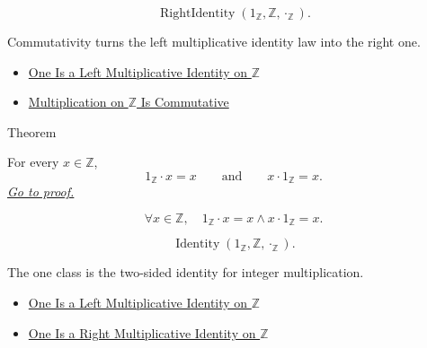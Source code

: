 \begin{remark*}
\[
\operatorname{RightIdentity}(1_{\mathbb{Z}},\mathbb{Z},\cdot_{\mathbb{Z}}).
\]
\end{remark*}

\begin{remark*}[Interpretation]
Commutativity turns the left multiplicative identity law into the right one.
\end{remark*}

\begin{dependencies}
\begin{itemize}
  \item \hyperref[thm:one-left-multiplicative-identity-on-z]{One Is a Left Multiplicative Identity on $\mathbb{Z}$}
  \item \hyperref[thm:multiplication-on-z-commutative]{Multiplication on $\mathbb{Z}$ Is Commutative}
\end{itemize}
\end{dependencies}

\begin{theorembox}{Theorem}
\begin{theorem}
\label{thm:one-multiplicative-identity-on-z}
For every $x\in\mathbb{Z}$,
\[
1_{\mathbb{Z}}\cdot x=x
\qquad\text{and}\qquad
x\cdot 1_{\mathbb{Z}}=x.
\]
\hyperref[prf:one-multiplicative-identity-on-z]{\textit{Go to proof.}}
\end{theorem}
\end{theorembox}

\begin{remark*}
\[
\forall x\in\mathbb{Z},\quad
1_{\mathbb{Z}}\cdot x=x\land x\cdot 1_{\mathbb{Z}}=x.
\]
\end{remark*}

\begin{remark*}
\[
\operatorname{Identity}(1_{\mathbb{Z}},\mathbb{Z},\cdot_{\mathbb{Z}}).
\]
\end{remark*}

\begin{remark*}[Interpretation]
The one class is the two-sided identity for integer multiplication.
\end{remark*}

\begin{dependencies}
\begin{itemize}
  \item \hyperref[thm:one-left-multiplicative-identity-on-z]{One Is a Left Multiplicative Identity on $\mathbb{
Z}$}
  \item \hyperref[cor:one-right-multiplicative-identity-on-z]{One Is a Right Multiplicative Identity on $\mathbb{Z}$}
\end{itemize}
\end{dependencies}

